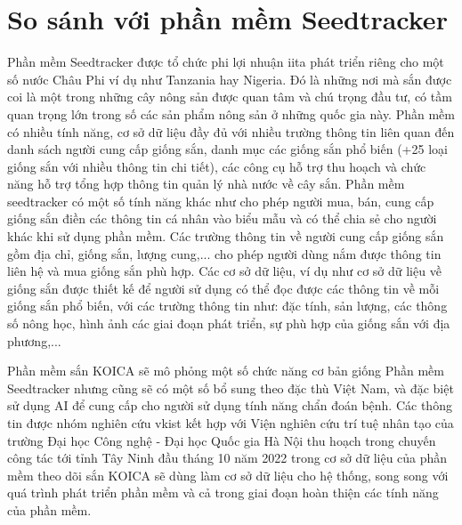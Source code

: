 \documentclass[./../main.tex]{subfiles}
\begin{document}
\section{So sánh với phần mềm Seedtracker}
Phần mềm Seedtracker \cite{seedtracker} được tổ chức phi lợi nhuận \acrshort{iita} phát triển riêng cho một số nước Châu Phi ví dụ như Tanzania hay Nigeria. Đó là những nơi mà sắn được coi là một trong những cây nông sản được quan tâm và chú trọng đầu tư, có tầm quan trọng lớn trong số các sản phẩm nông sản ở những quốc gia này. Phần mềm có nhiều tính năng, cơ sở dữ liệu đầy đủ với nhiều trường thông tin liên quan đến danh sách người cung cấp giống sắn, danh mục các giống sắn phổ biến (+25 loại giống sắn với nhiều thông tin chi tiết), các công cụ hỗ trợ thu hoạch và chức năng hỗ trợ tổng hợp thông tin quản lý nhà nước về cây sắn. Phần mềm seedtracker có một số tính năng khác như cho phép người mua, bán, cung cấp giống sắn điền các thông tin cá nhân vào biểu mẫu và có thể chia sẻ cho người khác khi sử dụng phần mềm. Các trường thông tin về người cung cấp giống sắn gồm địa chỉ, giống sắn, lượng cung,... cho phép người dùng nắm được thông tin liên hệ và mua giống sắn phù hợp. Các cơ sở dữ liệu, ví dụ như cơ sở dữ liệu về giống sắn được thiết kế để người sử dụng có thể đọc được các thông tin về mỗi giống sắn phổ biến, với các trường thông tin như: đặc tính, sản lượng, các thông số nông học, hình ảnh các giai đoạn phát triển, sự phù hợp của giống sắn với địa phương,...

Phần mềm sắn KOICA sẽ mô phỏng một số chức năng cơ bản giống Phần mềm Seedtracker nhưng cũng sẽ có một số bổ sung theo đặc thù Việt Nam, và đặc biệt sử dụng AI để cung cấp cho người sử dụng tính năng chẩn đoán bệnh. Các thông tin được nhóm nghiên cứu \acrshort{vkist} kết hợp với Viện nghiên cứu trí tuệ nhân tạo của trường Đại học Công nghệ - Đại học Quốc gia Hà Nội thu hoạch trong chuyến công tác tới tỉnh Tây Ninh đầu tháng 10 năm 2022 trong cơ sở dữ liệu của phần mềm theo dõi sắn KOICA sẽ dùng làm cơ sở dữ liệu cho hệ thống, song song với quá trình phát triển phần mềm và cả trong giai đoạn hoàn thiện các tính năng của phần mềm.
\end{document}
